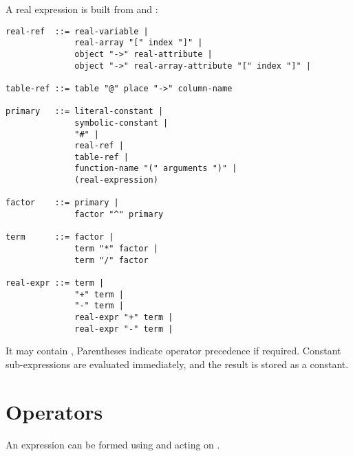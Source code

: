 A real expression is built from  and 
:

\begin{verbatim}
real-ref  ::= real-variable |
              real-array "[" index "]" |
              object "->" real-attribute |
              object "->" real-array-attribute "[" index "]" |

table-ref ::= table "@" place "->" column-name

primary   ::= literal-constant |
              symbolic-constant |
              "#" |
              real-ref |
              table-ref |
              function-name "(" arguments ")" |
              (real-expression)

factor    ::= primary |
              factor "^" primary

term      ::= factor |
              term "*" factor |
              term "/" factor

real-expr ::= term |
              "+" term |
              "-" term |
              real-expr "+" term |
              real-expr "-" term |
\end{verbatim}

It may contain ,
Parentheses indicate operator precedence if required.
Constant sub-expressions are evaluated immediately,
and the result is stored as a constant.

\section{Operators}
An expression can be formed using  and 
acting on .

